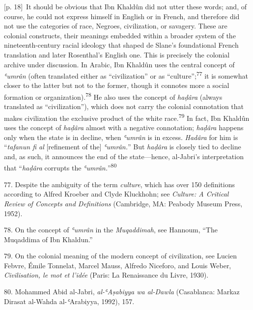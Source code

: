 \documentclass[10pt,a4paper]{article}
\begin{document}
{\scriptsize\color{gray} [p. 18]}\ It should be obvious that Ibn Khaldûn did not utter these words; and, of course, he could not express himself in English or in French, and therefore did not use the categories of race, Negroes, civilization, or savagery. These are colonial constructs, their meanings embedded within a broader system of the nineteenth-century racial ideology that shaped de Slane’s foundational French translation and later Rosenthal’s English one. This is precisely the colonial archive under discussion. In Arabic, Ibn Khaldûn uses the central concept of \textit{ʿumrân} (often translated either as “civilization” or as “culture”;\nobreak\textsuperscript{77} it is somewhat closer to the latter but not to the former, though it connotes more a social formation or organization).\nobreak\textsuperscript{78} He also uses the concept of \textit{haḍâra} (always translated as “civilization”), which does not carry the colonial connotation that makes civilization the exclusive product of the white race.\nobreak\textsuperscript{79} In fact, Ibn Khaldûn uses the concept of \textit{haḍâra} almost with a negative connotation; \textit{haḍâra} happens only when the state is in decline, when \textit{ʿumrân} is in excess. \textit{Hadâra} for him is “\textit{tafanun fi al} [refinement of the] \textit{ʿumrân.}” But \textit{haḍâra} is closely tied to decline and, as such, it announces the end of the state—hence, al-Jabri’s interpretation that “\textit{haḍâra} corrupts the \textit{ʿumrân.}”\nobreak\textsuperscript{80}\par{\small 77. Despite the ambiguity of the term \textit{culture}, which has over 150 definitions according to Alfred Kroeber and Clyde Kluckhohn; see \textit{Culture: A Critical Review of Concepts and Definitions} (Cambridge, MA: Peabody Museum Press, 1952).\par}{\small 78. On the concept of \textit{ʿumrân} in the \textit{Muqaddimah}, see Hannoum, “The Muqaddima of Ibn Khaldun.”\par}{\small 79. On the colonial meaning of the modern concept of civilization, see Lucien Febvre, Émile Tonnelat, Marcel Mauss, Alfredo Niceforo, and Louis Weber, \textit{Civilisation, le mot et l’idée} (Paris: La Renaissance du Livre, 1930).\par}{\small 80. Mohammed Abid al-Jabri, \textit{al-ʿAṣabiyya wa al-Dawla} (Casablanca: Markaz Dirasat al-Wahda al-\textit{ʿ}Arabiyya, 1992), 157.\par}
\end{document}
